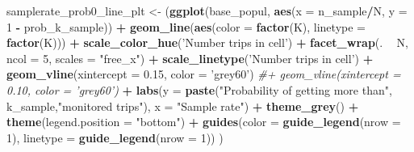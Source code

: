 \documentclass[
]{article}
\newenvironment{Shaded}{\begin{snugshade}}{\end{snugshade}}
\newcommand{\CommentTok}[1]{\textcolor[rgb]{0.56,0.35,0.01}{\textit{#1}}}
\newcommand{\DataTypeTok}[1]{\textcolor[rgb]{0.13,0.29,0.53}{#1}}
\newcommand{\DecValTok}[1]{\textcolor[rgb]{0.00,0.00,0.81}{#1}}
\newcommand{\FloatTok}[1]{\textcolor[rgb]{0.00,0.00,0.81}{#1}}
\newcommand{\KeywordTok}[1]{\textcolor[rgb]{0.13,0.29,0.53}{\textbf{#1}}}
\newcommand{\NormalTok}[1]{#1}
\newcommand{\OperatorTok}[1]{\textcolor[rgb]{0.81,0.36,0.00}{\textbf{#1}}}
\newcommand{\StringTok}[1]{\textcolor[rgb]{0.31,0.60,0.02}{#1}}
\begin{document}
\begin{Shaded}
\begin{Highlighting}[]
{\NormalTok{samplerate_prob0_line_plt <-}\StringTok{ }\NormalTok{(}\KeywordTok{ggplot}\NormalTok{(base_popul, }\KeywordTok{aes}\NormalTok{(}\DataTypeTok{x =}\NormalTok{ n_sample}\OperatorTok{/}\NormalTok{N, }\DataTypeTok{y =} \DecValTok{1} \OperatorTok{-}\StringTok{ }\NormalTok{prob_k_sample)) }
            \OperatorTok{+}\StringTok{ }\KeywordTok{geom_line}\NormalTok{(}\KeywordTok{aes}\NormalTok{(}\DataTypeTok{color =} \KeywordTok{factor}\NormalTok{(K), }\DataTypeTok{linetype =} \KeywordTok{factor}\NormalTok{(K)))}
            \OperatorTok{+}\StringTok{ }\KeywordTok{scale_color_hue}\NormalTok{(}\StringTok{'Number trips in cell'}\NormalTok{)}
            \OperatorTok{+}\StringTok{ }\KeywordTok{facet_wrap}\NormalTok{(. }\OperatorTok{~}\StringTok{ }\NormalTok{N, }\DataTypeTok{ncol =} \DecValTok{5}\NormalTok{, }\DataTypeTok{scales =} \StringTok{"free_x"}\NormalTok{)}
            \OperatorTok{+}\StringTok{ }\KeywordTok{scale_linetype}\NormalTok{(}\StringTok{'Number trips in cell'}\NormalTok{)}
            \OperatorTok{+}\StringTok{ }\KeywordTok{geom_vline}\NormalTok{(}\DataTypeTok{xintercept =} \FloatTok{0.15}\NormalTok{, }\DataTypeTok{color =} \StringTok{'grey60'}\NormalTok{)}
            \CommentTok{#+ geom_vline(xintercept = 0.10, color = 'grey60')}
            \OperatorTok{+}\StringTok{ }\KeywordTok{labs}\NormalTok{(}\DataTypeTok{y =} \KeywordTok{paste}\NormalTok{(}\StringTok{"Probability of getting more than"}\NormalTok{, k_sample,}\StringTok{"monitored trips"}\NormalTok{),}
                    \DataTypeTok{x =} \StringTok{"Sample rate"}\NormalTok{)}
            \OperatorTok{+}\StringTok{ }\KeywordTok{theme_grey}\NormalTok{()}
            \OperatorTok{+}\StringTok{ }\KeywordTok{theme}\NormalTok{(}\DataTypeTok{legend.position =} \StringTok{"bottom"}\NormalTok{)}
            \OperatorTok{+}\StringTok{ }\KeywordTok{guides}\NormalTok{(}\DataTypeTok{color =} \KeywordTok{guide_legend}\NormalTok{(}\DataTypeTok{nrow =} \DecValTok{1}\NormalTok{), }\DataTypeTok{linetype =} \KeywordTok{guide_legend}\NormalTok{(}\DataTypeTok{nrow =} \DecValTok{1}\NormalTok{))}
\NormalTok{            )}

}
\end{Highlighting}
\end{Shaded}
\end{document}
